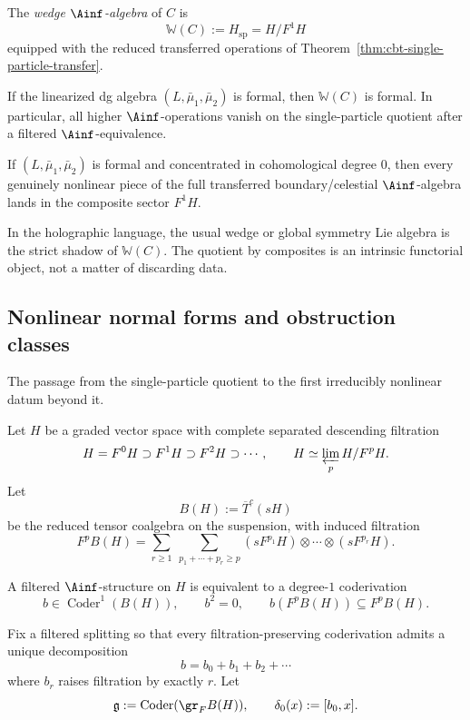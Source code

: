 \begin{definition}
The \emph{wedge $\Ainf$-algebra} of $C$ is
\[
\mathbb{W}(C):=H_{\mathrm{sp}}=H/F^1H
\]
equipped with the reduced transferred operations of Theorem~\ref{thm:cbt-single-particle-transfer}.
\end{definition}

\begin{corollary}
If the linearized dg algebra $(L,\bar\mu_1,\bar\mu_2)$ is formal, then $\mathbb{W}(C)$ is formal. In particular, all higher $\Ainf$-operations vanish on the single-particle quotient after a filtered $\Ainf$-equivalence.
\end{corollary}

\begin{corollary}
If $(L,\bar\mu_1,\bar\mu_2)$ is formal and concentrated in cohomological degree $0$, then every genuinely nonlinear piece of the full transferred boundary/celestial $\Ainf$-algebra lands in the composite sector $F^1H$.
\end{corollary}

\begin{remark}
In the holographic language, the usual wedge or global symmetry Lie algebra is the strict shadow of $\mathbb{W}(C)$. The quotient by composites is an intrinsic functorial object, not a matter of discarding data.
\end{remark}

\subsection{Nonlinear normal forms and obstruction classes}

The passage from the single-particle quotient to the first irreducibly nonlinear datum beyond it.

Let $H$ be a graded vector space with complete separated descending filtration
\[
H=F^0H\supset F^1H\supset F^2H\supset \cdots,
\qquad
H\simeq \varprojlim_p H/F^pH.
\]
Let
\[
B(H):=\overline{T}^c(sH)
\]
be the reduced tensor coalgebra on the suspension, with induced filtration
\[
F^pB(H)=
\sum_{r\ge1}\ \sum_{p_1+\cdots+p_r\ge p}
(sF^{p_1}H)\otimes\cdots\otimes(sF^{p_r}H).
\]

A filtered $\Ainf$-structure on $H$ is equivalent to a degree-$1$ coderivation
\[
b\in \operatorname{Coder}^1(B(H)),
\qquad
b^2=0,
\qquad
b(F^pB(H))\subseteq F^pB(H).
\]

Fix a filtered splitting so that every filtration-preserving coderivation admits a unique decomposition
\[
b=b_0+b_1+b_2+\cdots
\]
where $b_r$ raises filtration by exactly $r$. Let
\[
\mathfrak g:=\operatorname{Coder}(\gr_FB(H)),
\qquad
\delta_0(x):=[b_0,x].
\]

